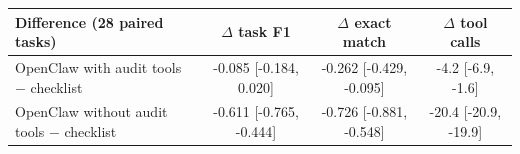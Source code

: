 \begin{tabular}{@{}lccc@{}}
\toprule
Difference (28 paired tasks) & $\Delta$ task F1 & $\Delta$ exact match & $\Delta$ tool calls \\
\midrule
OpenClaw with audit tools $-$ checklist & -0.085 [-0.184, 0.020] & -0.262 [-0.429, -0.095] & -4.2 [-6.9, -1.6] \\
OpenClaw without audit tools $-$ checklist & -0.611 [-0.765, -0.444] & -0.726 [-0.881, -0.548] & -20.4 [-20.9, -19.9] \\
\bottomrule
\end{tabular}
